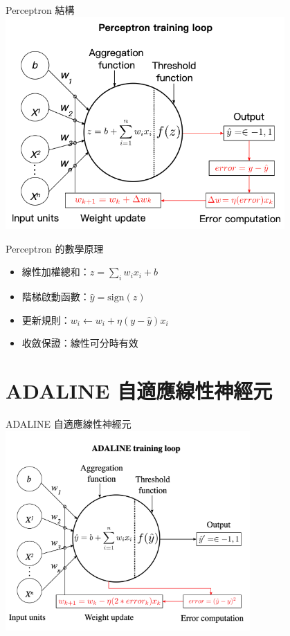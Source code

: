 \documentclass{beamer}
\begin{document}
\begin{frame}{Perceptron 結構}
  \centering
  \includegraphics[width=0.8\textwidth]{perceptron_pic.png}
\end{frame}

\begin{frame}{Perceptron 的數學原理}
  \begin{itemize}
    \item 線性加權總和：$z=\sum_i w_i x_i + b$
    \item 階梯啟動函數：$\hat y=\mathrm{sign}(z)$
    \item 更新規則：$w_i\leftarrow w_i+\eta(y-\hat y)x_i$
    \item 收斂保證：線性可分時有效
  \end{itemize}
\end{frame}

\section{ADALINE 自適應線性神經元}
\begin{frame}{ADALINE 自適應線性神經元}
  \centering
  \includegraphics[width=0.7\textwidth]{ADALINE_picture.png}
\end{frame}
\end{document}
